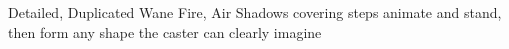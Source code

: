   {Detailed, Duplicated}%
  {Wane}%
  {Fire, Air}%
  {}%
  {Shadows covering  steps animate and stand, then form any shape the caster can clearly imagine}%
  {}
